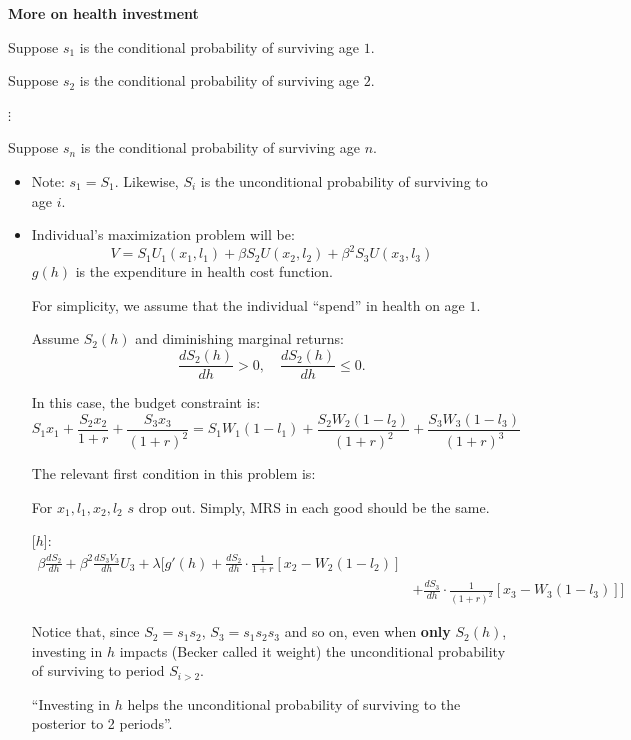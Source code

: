 \documentclass[14pt,notitlepage]{article}
\begin{document}
\textbf{More on health investment}

Suppose $s_1$ is the conditional probability of surviving age $1$.

Suppose $s_2$ is the conditional probability of surviving age $2$.

$\vdots$

Suppose $s_n$ is the conditional probability of surviving age $n$.
\begin{itemize}
\item Note: $s_1 = S_1$.
Likewise, $S_i$ is the unconditional probability of surviving to age $i$.
\item Individual's maximization problem will be:
\begin{equation*}
V = S_1 U_1 (x_1,l_1) + \beta S_2 U(x_2,l_2) + \beta^2 S_3 U(x_3,l_3)
\end{equation*}
$g(h)$ is the expenditure in health cost function.

For simplicity, we assume that the individual ``spend'' in health on age $1$.

Assume $S_2(h)$ and diminishing marginal returns:
\begin{equation*}
\frac{dS_2(h)}{dh} > 0, \quad \frac{dS_2(h)}{dh} \leq 0.
\end{equation*}

In this case, the budget constraint is:
\begin{equation*}
S_1 x_1 + \frac{S_2 x_2}{1+r} + \frac{S_3 x_3}{(1+r)^2} = S_1 W_1 (1-l_1) + \frac{S_2 W_2 (1-l_2)}{(1+r)^2} + \frac{S_3 W_3(1-l_3)}{(1+r)^3}
\end{equation*}

The relevant first condition in this problem is:

For $x_1,l_1,x_2,l_2$ \quad $s$ drop out. Simply, MRS in each good should be the same.

[$h$]:
\begin{align*}
\beta \frac{dS_2}{dh} + \beta^2 \frac{dS_3 V_3}{dh} U_3 + \lambda [g'(h)+\frac{dS_2}{dh}\cdot\frac{1}{1+r}[x_2 - W_2(1-l_2)] \\
&+ \frac{dS_3}{dh}\cdot\frac{1}{(1+r)^2}[x_3 - W_3(1-l_3)]]
\end{align*}

Notice that, since $S_2 = s_1s_2$, $S_3 = s_1s_2s_3$ and so on, even when \textbf{only} $S_2(h)$, investing in $h$ impacts (Becker called it weight) the unconditional probability of surviving to period $S_{i>2}$.

``Investing in $h$ helps the unconditional probability of surviving to the posterior to 2 periods''.


\end{itemize}
\end{document}

